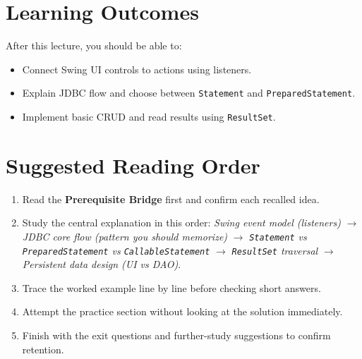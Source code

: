 \documentclass[11pt]{article}
\begin{document}
\section{Learning Outcomes}
After this lecture, you should be able to:
\begin{itemize}
  \item Connect Swing UI controls to actions using listeners.
  \item Explain JDBC flow and choose between \texttt{Statement} and \texttt{PreparedStatement}.
  \item Implement basic CRUD and read results using \texttt{ResultSet}.
\end{itemize}

\section{Suggested Reading Order}
\begin{enumerate}
  \item Read the \textbf{Prerequisite Bridge} first and confirm each recalled idea.
  \item Study the central explanation in this order: \textit{Swing event model (listeners)} $\rightarrow$ \textit{JDBC core flow (pattern you should memorize)} $\rightarrow$ \textit{\texttt{Statement} vs \texttt{PreparedStatement} vs \texttt{CallableStatement}} $\rightarrow$ \textit{\texttt{ResultSet} traversal} $\rightarrow$ \textit{Persistent data design (UI vs DAO)}.
  \item Trace the worked example line by line before checking short answers.
  \item Attempt the practice section without looking at the solution immediately.
  \item Finish with the exit questions and further-study suggestions to confirm retention.
\end{enumerate}
\notesources{\OOPSUnitIVSources}
\end{document}
